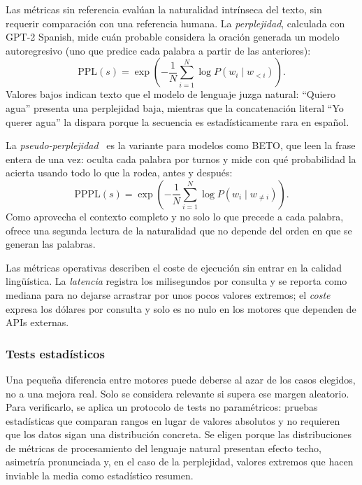 Las métricas sin referencia evalúan la naturalidad intrínseca del texto, sin requerir comparación con una referencia humana. La \textit{perplejidad}, calculada con GPT-2 Spanish, mide cuán probable considera la oración generada un modelo autoregresivo (uno que predice cada palabra a partir de las anteriores):
\begin{equation}
\text{PPL}(s) = \exp\!\left(-\frac{1}{N} \sum_{i=1}^{N} \log P(w_i \mid w_{<i})\right).
\end{equation}
Valores bajos indican texto que el modelo de lenguaje juzga natural: ``Quiero agua'' presenta una perplejidad baja, mientras que la concatenación literal ``Yo querer agua'' la dispara porque la secuencia es estadísticamente rara en español.

La \textit{pseudo-perplejidad}~\cite{salazar2020masked} es la variante para modelos como BETO, que leen la frase entera de una vez: oculta cada palabra por turnos y mide con qué probabilidad la acierta usando todo lo que la rodea, antes y después:
\begin{equation}
\text{PPPL}(s) = \exp\!\left(-\frac{1}{N} \sum_{i=1}^{N} \log P(w_i \mid w_{\neq i})\right).
\end{equation}
Como aprovecha el contexto completo y no solo lo que precede a cada palabra, ofrece una segunda lectura de la naturalidad que no depende del orden en que se generan las palabras.

Las métricas operativas describen el coste de ejecución sin entrar en la calidad lingüística. La \textit{latencia} registra los milisegundos por consulta y se reporta como mediana para no dejarse arrastrar por unos pocos valores extremos; el \textit{coste} expresa los dólares por consulta y solo es no nulo en los motores que dependen de APIs externas.

\subsubsection{Tests estadísticos}
\label{sec:eval-tests}

Una pequeña diferencia entre motores puede deberse al azar de los casos elegidos, no a una mejora real. Solo se considera relevante si supera ese margen aleatorio. Para verificarlo, se aplica un protocolo de tests no paramétricos: pruebas estadísticas que comparan rangos en lugar de valores absolutos y no requieren que los datos sigan una distribución concreta. Se eligen porque las distribuciones de métricas de procesamiento del lenguaje natural presentan efecto techo, asimetría pronunciada y, en el caso de la perplejidad, valores extremos que hacen inviable la media como estadístico resumen.

